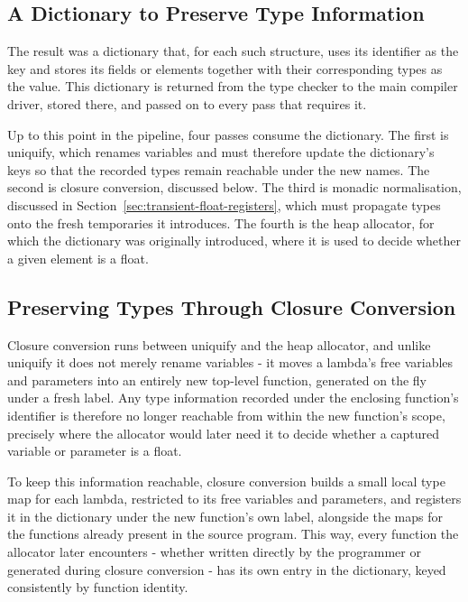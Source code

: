 \subsection{A Dictionary to Preserve Type Information}

The result was a dictionary that, for each such structure, uses its identifier as the key and stores its fields or elements together with their corresponding types as the value. This dictionary is returned from the type checker to the main compiler driver, stored there, and passed on to every pass that requires it.

Up to this point in the pipeline, four passes consume the dictionary. The first is uniquify, which renames variables and must therefore update the dictionary's keys so that the recorded types remain reachable under the new names. The second is closure conversion, discussed below. The third is monadic normalisation, discussed in Section~\ref{sec:transient-float-registers}, which must propagate types onto the fresh temporaries it introduces. The fourth is the heap allocator, for which the dictionary was originally introduced, where it is used to decide whether a given element is a float.

\subsection{Preserving Types Through Closure Conversion}

Closure conversion runs between uniquify and the heap allocator, and unlike uniquify it does not merely rename variables - it moves a lambda's free variables and parameters into an entirely new top-level function, generated on the fly under a fresh label. Any type information recorded under the enclosing function's identifier is therefore no longer reachable from within the new function's scope, precisely where the allocator would later need it to decide whether a captured variable or parameter is a float.

To keep this information reachable, closure conversion builds a small local type map for each lambda, restricted to its free variables and parameters, and registers it in the dictionary under the new function's own label, alongside the maps for the functions already present in the source program. This way, every function the allocator later encounters - whether written directly by the programmer or generated during closure conversion - has its own entry in the dictionary, keyed consistently by function identity.

